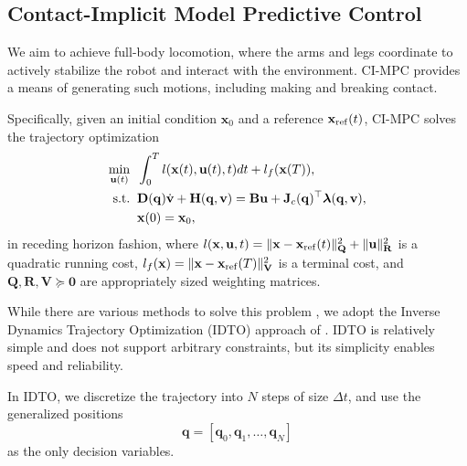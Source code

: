 
\subsection{Contact-Implicit Model Predictive Control} \label{sec:cimpc}
We aim to achieve full-body locomotion, where the arms and legs coordinate to actively stabilize the robot and interact with the environment. CI-MPC provides a means of generating such motions, including making and breaking contact.


Specifically, given an initial condition $\bm x_0$ and a reference $\mathbf{x}_{\mathrm{ref}}(t)$, CI-MPC solves the trajectory optimization
\begin{subequations} \label{eq:continuous-time-RHC}
\begin{align}
    \underset{\mathbf{u}(t)}{\mathrm{min}} \; \; & \int_{0}^{T} l(\mathbf{x}(t), {\mathbf{u}(t)}, t) dt + l_f(\mathbf{x}(T)), \\
    \mathrm{s.t.} \; \; 
    & \mathbf{D}(\mathbf{q}) \dot{\mathbf{v}} + \mathbf{H}(\mathbf{q}, \mathbf{v}) 
    = \mathbf{B} \mathbf{u} + \mathbf{J}_c(\mathbf{q})^\top \boldsymbol{\lambda} (\mathbf{q}, \mathbf{v}), \\
    & \mathbf{x}(0) = \mathbf{x}_0,
\end{align}
\end{subequations}
in receding horizon fashion, where $l(\mathbf{x}, \mathbf{u}, t) = \| \mathbf{x} - \mathbf{x}_{\mathrm{ref}}(t) \|_{\mathbf{Q}}^2 + \|\mathbf{u} \|_{\mathbf{R}}^2$ is a quadratic running cost, $l_f(\mathbf{x}) = \| \mathbf{x} - \mathbf{x}_{\mathrm{ref}}(T) \|_{\mathbf{V}}^2$ is a terminal cost, and $\bm Q, \bm R,\bm V \succeq \bm 0$ are appropriately sized weighting matrices.

While there are various methods to solve this problem \cite{cleach_fast_2023, aydinoglu2023consensus, kim2023contact, jin2024complementarity}, we adopt the Inverse Dynamics Trajectory Optimization (IDTO) approach of \cite{kurtz2023inverse}. IDTO is relatively simple and does not support arbitrary constraints, but its simplicity enables speed and reliability. 

In IDTO, we discretize the trajectory into $N$ steps of size $\Delta t$, and use the generalized positions 
\begin{equation}
    \bm q = [\bm q_0, \bm q_1, \dots, \bm q_N]
\end{equation}
as the only decision variables. 

